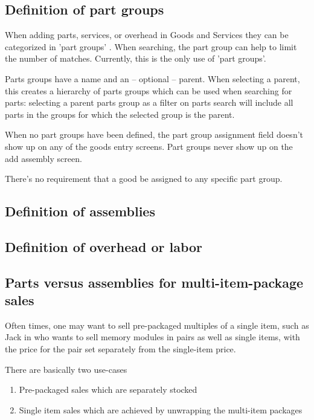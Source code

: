\subsection{Definition of part groups}
\label{subsec-parts-groups}

When adding parts, services, or overhead in Goods and Services they can be categorized in 'part groups' .
When searching, the part group can help to limit the number of matches.  Currently, this is the only use of 'part groups'.

Parts groups have a name and an -- optional -- parent. When
selecting a parent, this creates a hierarchy of parts groups which
can be used when searching for parts: selecting a parent parts
group as a filter on parts search will include all parts in the 
groups for which the selected group is the parent.

When no part groups have been defined, the part group assignment field doesn't
show up on any of the goods entry screens. Part groups never show up on the add assembly screen.

There's no requirement that a good be assigned to any specific part group.

\subsection{Definition of assemblies}
\label{subsec-assemblies-definition}


\subsection{Definition of overhead or labor}
\label{subsec-overhead-definition}

\subsection{Parts versus assemblies for multi-item-package sales}
\label{subsec-parts-versus-assemblies}

Often times, one may want to sell pre-packaged multiples of a single item, such as Jack
in  who wants to sell memory modules in pairs as well as
single items, with the price for the pair set separately from the single-item price.

There are basically two use-cases

\begin{enumerate}
\item Pre-packaged sales which are separately stocked
\item Single item sales which are achieved by unwrapping the multi-item packages
\end{enumerate}

